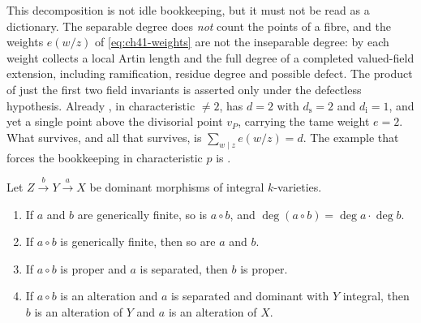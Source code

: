 This decomposition is not idle bookkeeping, but it must not be read as a
dictionary.  The separable degree does \emph{not} count the points of a
fibre, and the weights $e(w/z)$ of \eqref{eq:ch41-weights} are not the
inseparable degree: by  each weight collects
a local Artin length and the full degree of a completed valued-field
extension, including ramification, residue degree and possible defect.
The product of just the first two field invariants is asserted
only under the defectless hypothesis.  Already , in characteristic
$\ne2$, has $d=2$ with $d_{\mathrm s}=2$ and $d_{\mathrm i}=1$,
and yet a single point above the divisorial point $v_P$, carrying the
tame weight $e=2$.  What survives, and all that survives, is
$\sum_{w\mid z}e(w/z)=d$.  The example that forces the bookkeeping in
characteristic $p$ is .

\begin{lemma}
\label{lem:ch42-degree-composite}
Let $Z\xrightarrow{\ b\ }Y\xrightarrow{\ a\ }X$ be dominant morphisms of
integral $k$-varieties.
\begin{enumerate}
\item\label{itm:ch42-deg:comp} If $a$ and $b$ are generically finite,
      so is $a\circ b$, and
      $\deg(a\circ b)=\deg a\cdot\deg b$.
\item\label{itm:ch42-deg:cancel} If $a\circ b$ is generically finite, then
      so are $a$ and $b$.
\item\label{itm:ch42-deg:proper} If $a\circ b$ is proper and $a$ is
      separated, then $b$ is proper.
\item\label{itm:ch42-deg:alteration} If $a\circ b$ is an alteration and
      $a$ is separated and dominant with $Y$ integral, then $b$ is an
      alteration of $Y$ and $a$ is an alteration of $X$.
\end{enumerate}
\end{lemma}

